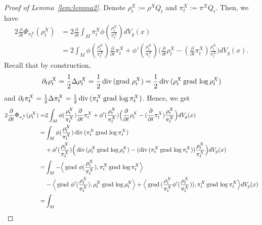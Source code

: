 \begin{proof}[Proof of Lemma~\ref{lem:lemma2}]
    Denote $\rho_{t}^{X} := \rho^{X}Q_{t}$ and $\pi_{t}^{X} := \pi^{X}Q_{t}$. Then, we have
    \begin{align*}
            2 \frac{\partial }{\partial t} \Phi_{\pi_{t}^{X}} (\rho_{t}^{X})
            &= 2 \frac{\partial }{\partial t} \int_{M} \pi_{t}^{X} \phi(\frac{\rho_{t}^{X}}{\pi_{t}^{X}}) dV_{g}(x) \\
            &= 2 \int_{M} \phi(\frac{\rho_{t}^{X}}{\pi_{t}^{X}})\frac{\partial}{\partial t} \pi_{t}^{X} 
            + \phi'(\frac{\rho_{t}^{X}}{\pi_{t}^{X}}) 
            \Big( \frac{\partial }{\partial t} \rho_{t}^{X} - (\frac{\partial}{\partial t} \pi_{t}^{X}) \frac{\rho_{t}^{X}}{\pi_{t}^{X}} \Big) dV_{g}(x).
    \end{align*}
Recall that by construction, 
    $$\partial_{t} \rho_{t}^{X} = \frac{1}{2} \Delta \rho_{t}^{X} = \frac{1}{2} \operatorname{div\,} (\operatorname{grad\,} \rho_{t}^{X}) = \frac{1}{2} \operatorname{div\,} (\rho_{t}^{X} \operatorname{grad\,} \log \rho_{t}^{X})$$
    and $\partial_{t} \pi_{t}^{X} = \frac{1}{2} \Delta \pi_{t}^{X} = \frac{1}{2} \operatorname{div\,} (\pi_{t}^{X} \operatorname{grad\,} \log \pi_{t}^{X})$.
    Hence, we get 
    \begin{align*}
            2 \frac{\partial }{\partial t} \Phi_{\pi_{t}^{X}} (\rho_{t}^{X})
            =& 2 \int_{M} \phi(\frac{\rho_{t}^{X}}{\pi_{t}^{X}})\frac{\partial}{\partial t} \pi_{t}^{X} 
            + \phi'(\frac{\rho_{t}^{X}}{\pi_{t}^{X}}) 
            \Big( \frac{\partial }{\partial t} \rho_{t}^{X} - (\frac{\partial}{\partial t} \pi_{t}^{X}) \frac{\rho_{t}^{X}}{\pi_{t}^{X}} \Big) dV_{g}(x)\\
            =& \int_{M} \phi(\frac{\rho_{t}^{X}}{\pi_{t}^{X}})\Div (\pi_{t}^{X} \grad \log \pi_{t}^{X}) \\
            &+ \phi'(\frac{\rho_{t}^{X}}{\pi_{t}^{X}}) 
            \Big( \Div (\rho_{t}^{X} \grad \log \rho_{t}^{X}) - (\Div (\pi_{t}^{X} \grad \log \pi_{t}^{X})) \frac{\rho_{t}^{X}}{\pi_{t}^{X}} \Big) dV_{g}(x)\\
            =& \int_{M} 
            - \Big\langle \grad \phi(\frac{\rho_{t}^{X}}{\pi_{t}^{X}}), \pi_{t}^{X} \grad \log \pi_{t}^{X} \Big\rangle\\
            &- \Big\langle \grad \phi'(\frac{\rho_{t}^{X}}{\pi_{t}^{X}}) , \rho_{t}^{X} \grad \log \rho_{t}^{X} \Big\rangle 
            + \Big\langle \grad(\frac{\rho_{t}^{X}}{\pi_{t}^{X}} \phi'(\frac{\rho_{t}^{X}}{\pi_{t}^{X}})) , \pi_{t}^{X} \grad \log \pi_{t}^{X} \Big\rangle dV_{g}(x)\\
            =& \int_{M} 

\end{align*}
\end{proof}
